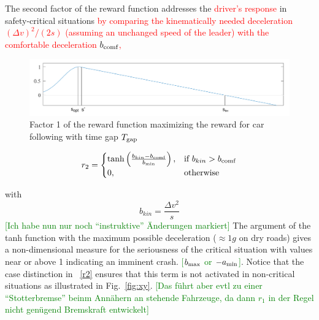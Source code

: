 \documentclass[review]{elsarticle}
\providecommand{\red}[1]{\textcolor{red}{#1}}
\providecommand{\green}[1]{\textcolor{green}{#1}}
\providecommand{\martin}[1]{\red{#1}} %
\providecommand{\martinc}[1]{\green{[#1]}} %
\providecommand{\sub}[1]{_{\text{{\scriptsize \hspace{-0.0ex}#1}}}}
\providecommand{\3}{{\ss}}
\begin{document}
The second factor of the reward function addresses the \martin{driver's
  response} in safety-critical situations \martin{by comparing the
  kinematically needed deceleration $(\Delta v)^2/(2s)$ (assuming an
  unchanged speed of the leader) with the
  comfortable deceleration $b\sub{comf}$,}

\begin{figure}
	\centering
	\includegraphics[width=12cm]{images/RewardFunc1}
	\caption{Factor 1 of the reward function maximizing the reward
          for car following with time gap $T_{\rm gap}$} 
	\label{fig:RewardFunc1}
\end{figure}


\begin{equation}
\label{r2}
r_2 = 
\begin{cases}
\tanh\left(\frac{b_{kin}-b_{\rm comf}}{b_{\rm min}}\right),& \text{if } b_{kin}>b_{\rm comf}\\
0,              & \text{otherwise}
\end{cases}
\end{equation}

with
\begin{equation}
b_{kin} = \frac{\Delta v^2}{s}
\end{equation}
\martinc{Ich habe nun nur noch ``instruktive'' \"Anderungen markiert}
The argument of the tanh function with  the
  maximum possible deceleration ($\approx 1 g$ on dry roads) gives a
  non-dimensional measure for the seriousness of the critical situation
  with values 
  near or above 1 indicating an imminent crash. \martinc{$b\sub{max}$
    or $-a\sub{min}$}. Notice that the case distinction in
~\eqref{r2}  ensures that
this term is not activated in non-critical situations as illustrated in Fig.~\ref{fig:xy}. \martinc{Das
    f\"uhrt aber evtl zu einer ``Stotterbremse'' beinm Ann\"ahern an
    stehende Fahrzeuge, da dann $r_1$ in der Regel nicht gen\"ugend
    Bremskraft entwickelt}
\end{document}
